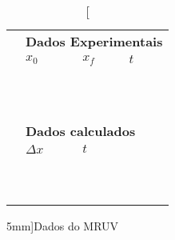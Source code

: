 \begin{table*}[!ht]
\centering
\begin{tabular}{lp{25mm}p{25mm}p{25mm}l}
\toprule
	&\multicolumn{4}{l}{\textbf{Dados Experimentais}} \\
	\cmidrule{2-4}
	& $x_0$ & $x_f$ & $t$ & \\
	\cmidrule{2-4}
	& \cellcolor[gray]{0.89} & \cellcolor[gray]{0.92} & \cellcolor[gray]{0.89} \\
	& \cellcolor[gray]{0.95} & \cellcolor[gray]{0.97} & \cellcolor[gray]{0.95} \\
	& \cellcolor[gray]{0.89} & \cellcolor[gray]{0.92} & \cellcolor[gray]{0.89} \\
	& \cellcolor[gray]{0.95} & \cellcolor[gray]{0.97} & \cellcolor[gray]{0.95} \\
	& \cellcolor[gray]{0.89} & \cellcolor[gray]{0.92} & \cellcolor[gray]{0.89} \\
	& \cellcolor[gray]{0.95} & \cellcolor[gray]{0.97} & \cellcolor[gray]{0.95} \\
	& \cellcolor[gray]{0.89} & \cellcolor[gray]{0.92} & \cellcolor[gray]{0.89} \\
	& \cellcolor[gray]{0.95} & \cellcolor[gray]{0.97} & \cellcolor[gray]{0.95} \\
	& \cellcolor[gray]{0.89} & \cellcolor[gray]{0.92} & \cellcolor[gray]{0.89} \\
	& \cellcolor[gray]{0.95} & \cellcolor[gray]{0.97} & \cellcolor[gray]{0.95} \\
	\cmidrule{2-4}
\\
	& \multicolumn{3}{l}{\textbf{Dados calculados}} \\
	\cmidrule{2-3}
	& $\Delta x$ & $t$ \\
	\cmidrule{2-3}
	& \cellcolor[gray]{0.89} & \cellcolor[gray]{0.92} \\
	& \cellcolor[gray]{0.95} & \cellcolor[gray]{0.97} \\
	& \cellcolor[gray]{0.89} & \cellcolor[gray]{0.92} \\
	& \cellcolor[gray]{0.95} & \cellcolor[gray]{0.97} \\
	& \cellcolor[gray]{0.89} & \cellcolor[gray]{0.92} \\
	& \cellcolor[gray]{0.95} & \cellcolor[gray]{0.97} \\
	& \cellcolor[gray]{0.89} & \cellcolor[gray]{0.92} \\
	& \cellcolor[gray]{0.95} & \cellcolor[gray]{0.97} \\
	& \cellcolor[gray]{0.89} & \cellcolor[gray]{0.92} \\
	& \cellcolor[gray]{0.95} & \cellcolor[gray]{0.97} \\
	\cmidrule{2-3}
\bottomrule
\end{tabular}
\caption[][5mm]{Dados do MRUV}
\label{DadosMRUV}
\end{table*}

